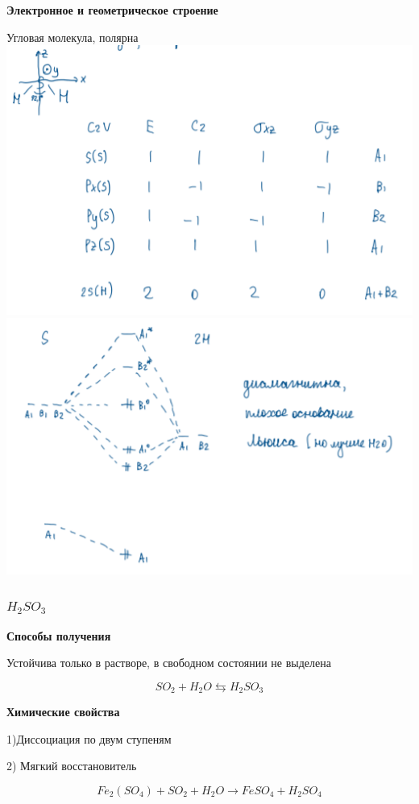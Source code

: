 \textbf{Электронное и геометрическое строение}

Угловая молекула, полярна\\
\includegraphics{images/6v4.png}
\includegraphics{images/6v5.png}

\subsubsection*{$H_2SO_3$}

\textbf{Способы получения}

 Устойчива только в растворе, в свободном состоянии не выделена

$$SO_2 + H_2O \leftrightarrows H_2SO_3$$

\textbf{Химические свойства}

1)Диссоциация по двум ступеням

2) Мягкий восстановитель

$$Fe_2(SO_4) + SO_2 + H_2O \rightarrow FeSO_4 + H_2SO_4$$

